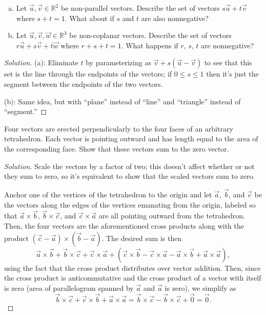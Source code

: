 \documentclass[11pt]{scrartcl}
\providecommand{\RR}{\mathbb R}
\providecommand{\ii}{\item}
\newenvironment{soln}{\begin{proof}[Solution]}{\end{proof}}
\begin{document}
\begin{problem}
	\begin{enumerate}[(a)]
		\ii Let $\vec u,\vec v\in\RR^2$ be non-parallel vectors.
		Describe the set of vectors $s\vec u + t\vec v$ where $s+t = 1$.
		What about if $s$ and $t$ are also nonnegative?
		\ii Let $\vec u, \vec v, \vec w\in\RR^3$ be non-coplanar vectors.
		Describe the set of vectors $r\vec u + s\vec v + t\vec w$
		where $r + s + t = 1$. What happens if $r$, $s$, $t$ are nonnegative?
	\end{enumerate}
\end{problem}

\begin{soln}
	(a): Eliminate $t$ by parameterizing as
	$\vec v + s(\vec u - \vec v)$ to see that this set is the line
	through the endpoints of the vectors;
	if $0\le s\le 1$ then it's just the segment between the endpoints of
	the two vectors.
	
	(b): Same idea, but with ``plane'' instead of ``line''
	and ``triangle'' instead of ``segment.''
\end{soln}

\begin{problem}
	Four vectors are erected perpendicularly to the four faces
	of an arbitrary tetrahedron. Each vector is pointing outward and has length
	equal to the area of the corresponding face.
	Show that these vectors sum to the zero vector.
\end{problem}

\begin{soln}
	Scale the vectors by a factor of two;
	this doesn't affect whether or not they sum to zero,
	so it's equivalent to show that the scaled vectors sum to zero.
	
	Anchor one of the vertices of the tetrahedron to the origin
	and let $\vec a$, $\vec b$, and $\vec c$ be the vectors
	along the edges of the vertices emanating from the origin,
	labeled so that $\vec a\times\vec b$, $\vec b\times\vec c$,
	and $\vec c\times\vec a$ are all pointing outward from the tetrahedron.
	Then, the four vectors are the aforementioned cross products
	along with the product $(\vec c - \vec a) \times (\vec b - \vec a)$.
	The desired sum is then
	\[\vec a \times \vec b + \vec b \times \vec c + \vec c \times \vec a
	+ (\vec c \times \vec b - \vec c \times \vec a - \vec a \times \vec b
	+ \vec a \times \vec a),\]
	using the fact that the cross product distributes over vector addition.
	Then, since the cross product is anticommutative and
	the cross product of a vector with itself is zero (area of parallelogram
	spanned by $\vec a$ and $\vec a$ is zero), we simplify as
	\[\vec b \times \vec c + \vec c \times \vec b + \vec a \times \vec a =
	\vec b\times \vec c - \vec b \times \vec c + \vec 0 = \vec 0.\]
\end{soln}
\end{document}
